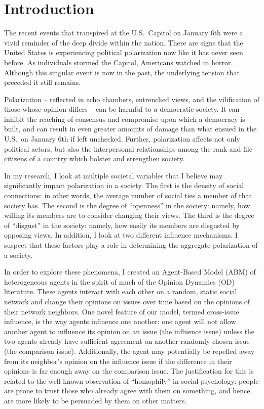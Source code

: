 \section{Introduction}

The recent events that transpired at the U.S.~Capitol on January 6th were a
vivid reminder of the deep divide within the nation. There are signs that the
United States is experiencing political polarization now like it has never seen
before. As individuals stormed the Capitol, Americans watched in horror.
Although this singular event is now in the past, the underlying tension that
preceded it still remains.

Polarization -- reflected in echo chambers, entrenched views, and the
vilification of those whose opinion differs -- can be harmful to a democratic
society. It can inhibit the reaching of consensus and compromise upon which a
democracy is built, and can result in even greater amounts of damage than what
ensued in the U.S.~on January 6th if left unchecked. Further, polarization
affects not only political actors, but also the interpersonal relationships
among the rank and file citizens of a country which bolster and strengthen
society.

In my research, I look at multiple societal variables that I believe may
significantly impact polarization in a society. The first is the density of
social connections: in other words, the average number of social ties a member
of that society has. The second is the degree of ``openness'' in the society:
namely, how willing its members are to consider changing their views. The third is the degree of ``disgust'' in the society: namely, how easily its members are disgusted by opposing views. In addition, I look at two different influence mechanisms. I suspect that these factors play a role in determining the aggregate
polarization of a society.

In order to explore these phenomena, I created an Agent-Based Model (ABM) of
heterogeneous agents in the spirit of much of the Opinion Dynamics (OD)
literature. These agents interact with each other on a random, static social
network and change their opinions on issues over time based on the opinions of
their network neighbors. One novel feature of our model, termed cross-issue influence,
is the way agents influence one another: one agent will not allow another agent to influence its
opinion on an issue (the influence issue) unless the two agents already have sufficient agreement on
another randomly chosen issue (the comparison issue). Additionally, the agent may potentially be repelled away from its neighbor's opinion on the influence issue if the difference in their opinions is far enough away on the comparison issue. The justification for this is related to the
well-known observation of ``homophily'' in social psychology: people are prone
to trust those who already agree with them on something, and hence are more
likely to be persuaded by them on other matters.


